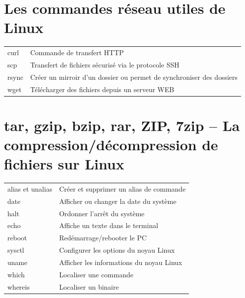 \documentclass[a4paper, 11pt, french, oneside]{book}
\begin{document}
		\section{Les commandes réseau utiles de Linux}
		    \begin{tabular}{p{3cm}|p{11cm}}
				curl	& Commande de transfert HTTP\\
				scp	& Transfert de fichiers sécurisé via le protocole SSH\\
				rsync	& Créer un mirroir d’un dossier ou permet de synchroniser des dossiers\\
				wget	& Télécharger des fichiers depuis un serveur WEB\\
		    
		    \end{tabular}
		\section{tar, gzip, bzip, rar, ZIP, 7zip – La compression/décompression de fichiers sur Linux}
		    \begin{tabular}{p{3cm}|p{11cm}}
				alias et unalias	& Créer et supprimer un alias de commande\\
				date	& Afficher ou changer la date du système\\
				halt	& Ordonner l’arrêt du système\\
				echo	& Affiche un texte dans le terminal\\
				reboot	& Redémarrage/rebooter le PC\\
				sysctl	& Configurer les options du noyau Linux\\
				uname	& Afficher les informations du noyau Linux\\
				which	& Localiser une commande\\
				whereis	& Localiser un binaire\\
		   \end{tabular}
		   \backmatter
\end{document}
